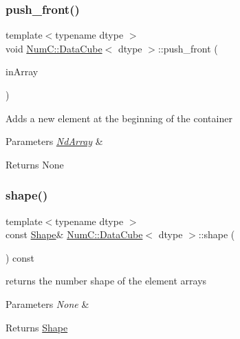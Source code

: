 \subsubsection{\texorpdfstring{push\+\_\+front()}{push\_front()}}
{\footnotesize\ttfamily template$<$typename dtype $>$ \\
void \mbox{\hyperlink{class_num_c_1_1_data_cube}{Num\+C\+::\+Data\+Cube}}$<$ dtype $>$\+::push\+\_\+front (\begin{DoxyParamCaption}\item[{const \mbox{\hyperlink{class_num_c_1_1_nd_array}{Nd\+Array}}$<$ dtype $>$ \&}]{in\+Array }\end{DoxyParamCaption})\hspace{0.3cm}{\ttfamily [inline]}}

Adds a new element at the beginning of the container


\begin{DoxyParams}{Parameters}
{\em \mbox{\hyperlink{class_num_c_1_1_nd_array}{Nd\+Array}}} & \\
\hline
\end{DoxyParams}
\begin{DoxyReturn}{Returns}
None 
\end{DoxyReturn}
\mbox{\label{class_num_c_1_1_data_cube_a1f65cef25b7b9b8b0371694e7898880e}} 
\subsubsection{\texorpdfstring{shape()}{shape()}}
{\footnotesize\ttfamily template$<$typename dtype $>$ \\
const \mbox{\hyperlink{class_num_c_1_1_shape}{Shape}}\& \mbox{\hyperlink{class_num_c_1_1_data_cube}{Num\+C\+::\+Data\+Cube}}$<$ dtype $>$\+::shape (\begin{DoxyParamCaption}{ }\end{DoxyParamCaption}) const\hspace{0.3cm}{\ttfamily [inline]}}

returns the number shape of the element arrays


\begin{DoxyParams}{Parameters}
{\em None} & \\
\hline
\end{DoxyParams}
\begin{DoxyReturn}{Returns}
\mbox{\hyperlink{class_num_c_1_1_shape}{Shape}} 
\end{DoxyReturn}
\mbox{\label{class_num_c_1_1_data_cube_a69051739dd638a04caed8ba001f01879}} 
